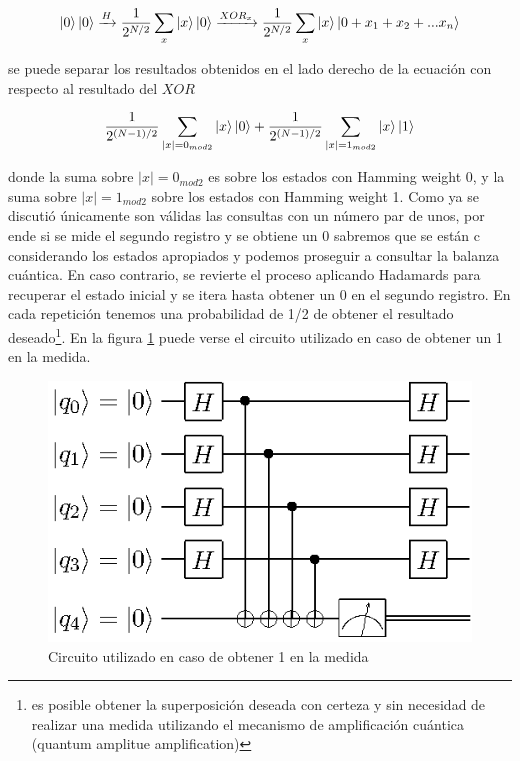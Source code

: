 \documentclass{article}
\begin{document}
\begin{equation}
\ket{0}\ket{0} \xrightarrow{H}\frac{1}{2^{N/2}}\sum_x\ket{x}\ket{0}\xrightarrow{XOR_x}\frac{1}{2^{N/2}}\sum_x \ket{x}\ket{0+x_1+x_2+...x_n}
\end{equation}


se puede separar los resultados obtenidos en el lado derecho de la ecuación  con respecto al resultado del $XOR$ 

\begin{equation}
\frac{1}{2^{(N-1)/2}}\sum_{|x|=0_{mod2}}\ket{x}\ket{0}+\frac{1}{2^{(N-1)/2}}\sum_{|x|=1_{mod2}}\ket{x}\ket{1}
\end{equation}

donde la suma sobre $|x|=0_{mod2}$ es sobre los estados con Hamming weight 0, y la suma sobre $|x|=1_{mod2}$ sobre los estados con Hamming weight 1.
Como ya se discutió únicamente son  válidas las consultas con un número par de unos, por ende si se mide el segundo registro y se obtiene un 0 sabremos que se están c considerando los estados apropiados y podemos proseguir a consultar la balanza cuántica. En caso contrario, se revierte el proceso aplicando Hadamards para recuperar el estado inicial y se itera hasta obtener un 0 en el segundo registro. En cada repetición tenemos una probabilidad de 1/2 de obtener el resultado deseado\footnote{es posible obtener la superposición deseada con certeza y sin necesidad de realizar una medida utilizando el mecanismo de amplificación cuántica (quantum amplitue amplification)\cite{5}}. En la figura \ref{fig:2} puede verse el circuito utilizado en caso de obtener un 1 en la medida.

\begin{figure}[h]
    \centering
    \includegraphics[scale=1.7]{img/reverse.eps}
    \caption{Circuito utilizado en caso de obtener 1 en la medida}
    \label{fig:2}
\end{figure}
\end{document}
